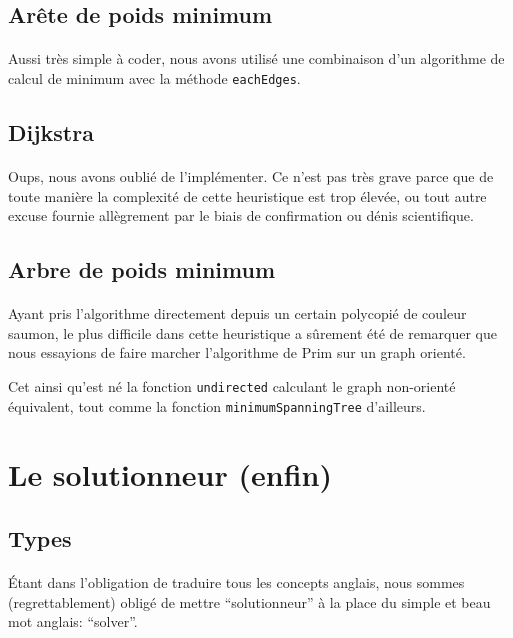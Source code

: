 \documentclass[french]{article}
\begin{document}
\subsection{Arête de poids minimum}

\paragraph{} Aussi très simple à coder, nous avons utilisé une combinaison d'un
algorithme de calcul de minimum avec la méthode \texttt{eachEdges}.

\subsection{Dijkstra}

\paragraph{} Oups, nous avons oublié de l'implémenter. Ce n'est pas très grave
parce que de toute manière la complexité de cette heuristique est trop élevée,
ou tout autre excuse fournie allègrement par le biais de confirmation ou dénis
scientifique.

\subsection{Arbre de poids minimum}

\paragraph{} Ayant pris l'algorithme directement depuis un certain polycopié de
couleur saumon, le plus difficile dans cette heuristique a sûrement été de
remarquer que nous essayions de faire marcher l'algorithme de Prim sur un graph
orienté.

Cet ainsi qu'est né la fonction \texttt{undirected} calculant le graph
non-orienté équivalent, tout comme la fonction \texttt{minimumSpanningTree}
d'ailleurs.

\section{Le solutionneur (enfin)}

\subsection{Types}

\paragraph{} Étant dans l'obligation de traduire tous les concepts anglais,
nous sommes (regrettablement) obligé de mettre ``solutionneur'' à la place du
simple et beau mot anglais: ``solver''.
\end{document}
